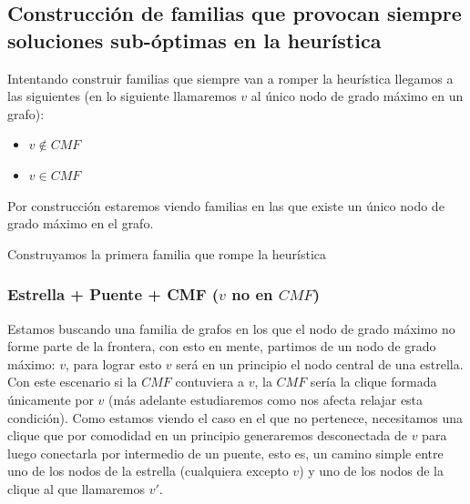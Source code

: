%
%
%			
%
%
%
%			

\subsection{Construcci\'on de familias que provocan siempre soluciones sub-\'optimas en la heur\'istica}

Intentando construir familias que siempre van a romper la heur\'istica llegamos a las siguientes
(en lo siguiente llamaremos $v$ al \'unico nodo de grado m\'aximo en un grafo):
\begin{itemize}
	\item{$v \notin CMF$}
	\item{$v \in CMF$}
\end{itemize}

Por construcci\'on estaremos viendo familias en las que existe un \'unico nodo de grado m\'aximo en el grafo.

Construyamos la primera familia que rompe la heur\'istica

\subsubsection{Estrella + Puente + CMF ($v$ no en $CMF$)}

Estamos buscando una familia de grafos en los que el nodo de grado m\'aximo no forme parte de la 
frontera, con esto en mente, partimos de un nodo de grado m\'aximo: $v$, para lograr esto $v$ ser\'a
en un principio el nodo central de una estrella. Con este escenario si la $CMF$ contuviera a $v$, la
$CMF$ ser\'ia la clique formada \'unicamente por $v$ (m\'as adelante estudiaremos como nos afecta 
relajar esta condici\'on). Como estamos viendo el caso en el que no pertenece, necesitamos una clique 
que por comodidad en un principio generaremos desconectada de $v$ para luego conectarla por 
intermedio de un puente, esto es, un camino simple entre uno de los nodos de la estrella (cualquiera
excepto $v$) y uno de los nodos de la clique al que llamaremos $v'$. 

